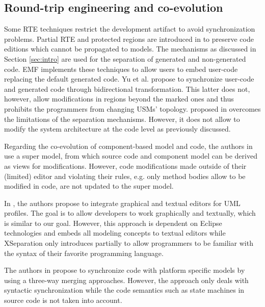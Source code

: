 \subsection{Round-trip engineering and co-evolution}
Some RTE techniques restrict the development artifact to avoid
synchronization problems.
Partial RTE and protected regions are introduced in \cite{czarnecki_multi-level_2006} to preserve code editions which cannot be propagated to models.
The mechanisms as discussed in Section \ref{sec:intro} are used for the separation of generated and non-generated code. 
EMF implements these techniques to allow users to embed user-code replacing the default generated code.
Yu et al. \cite{yu2012maintaining} propose to synchronize user-code and generated code through bidirectional transformation.
This latter does not, however, allow modifications in regions beyond the marked ones and thus prohibits the programmers from changing USMs' topology.
 proposed in \cite{zheng2012enhancing} overcomes the limitations of the separation mechanisms.
However, %
it does not allow to modify the system architecture at the code level as previously discussed.  




Regarding the co-evolution of component-based model and code, the authors in \cite{kramer2015change} use a super model, from which source code and component model can be derived as views for modifications.
However, code modifications made outside of their (limited) editor and violating their rules, e.g. only method bodies allow to be modified in code, are not updated to the super model. 
 
In \cite{Maro:2015:IGT:2814251.2814253}, the authors propose to integrate graphical and textual editors for UML profiles.
The goal is to allow developers to work graphically and textually, which is similar to our goal.
However, this approach is dependent on Eclipse technologies and embeds all modeling concepts to textual editors while XSeparation only introduces partially to allow programmers to be familiar with the syntax of their favorite programming language.

The authors in \cite{angyal_synchronizing_2008} propose to synchronize code with platform specific models by using a three-way merging approaches.
However, the approach only deals with syntactic synchronization while the code semantics such as state machines in source code is not taken into account.

